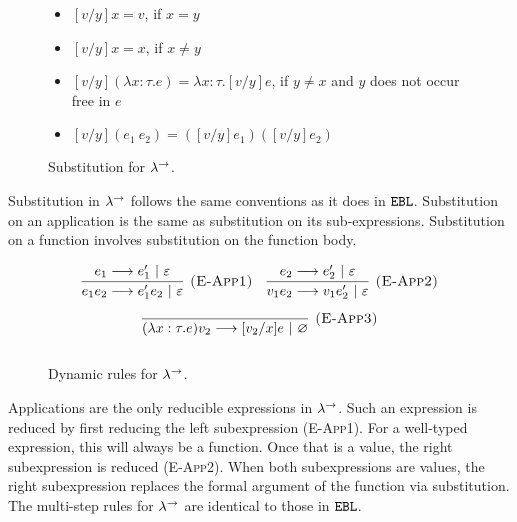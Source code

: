 \begin{figure}[h]


\begin{itemize}
	\setlength\itemsep{-0.7em}
	\item[] $[ v/y]x =  v$, if $x = y$
	\item[] $[ v/y]x = x$, if $x \neq y$
	\item[] $[ v/y](\lambda x:  \tau.  e) = \lambda x:  \tau.[ v/y] e$, if $y \neq x$ and $y$ does not occur free in $ e$
	\item[] $[ v/y]( e_1~ e_2) = ([ v/y] e_1)([ v/y] e_2)$
\end{itemize}

\vspace{-12pt}
\caption{Substitution for $\lambda^{\rightarrow}$.}
\label{This is the label.}
\end{figure}

Substitution in $\lambda^{\rightarrow}$ follows the same conventions as it does in $\mathtt{EBL}$. Substitution on an application is the same as substitution on its sub-expressions. Substitution on a function involves substitution on the function body.

\begin{figure}[h]

\noindent
{}

\[
\begin{array}{c}

\infer[\textsc{(E-App1)}]
	{ e_1  e_2 \longrightarrow  e_1'  e_2~|~\varepsilon}
	{ e_1 \longrightarrow  e_1'~|~\varepsilon}
	~~~
\infer[\textsc{(E-App2)}]
	{ v_1  e_2 \longrightarrow  v_1  e_2'~|~\varepsilon} 
	{ e_2 \longrightarrow  e_2'~|~\varepsilon}\\[2ex]
	
\infer[\textsc{(E-App3)}]
	{ (\lambda x:  \tau. e)  v_2 \longrightarrow [ v_2/x] e~|~\varnothing }
	{}\\[2ex]
	
\end{array}
\]

\vspace{-12pt}
\caption{Dynamic rules for $\lambda^{\rightarrow}$.}
\label{This is the label.}
\end{figure}

Applications are the only reducible expressions in $\lambda^{\rightarrow}$. Such an expression is reduced by first reducing the left subexpression (\textsc{E-App1}). For a well-typed expression, this will always be a function. Once that is a value, the right subexpression is reduced (\textsc{E-App2}). When both subexpressions are values, the right subexpression replaces the formal argument of the function via substitution. The multi-step rules for $\lambda^{\rightarrow}$ are identical to those in $\mathtt{EBL}$.

